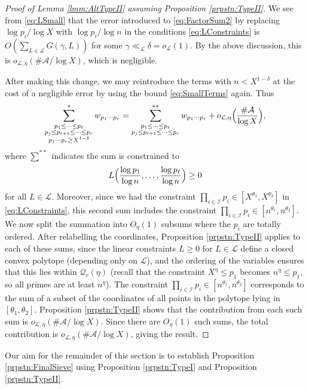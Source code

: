 \documentclass[10pt]{amsart}
\theoremstyle{plain}
\numberwithin{sblmm}{thrm}
\numberwithin{equation}{section}
\begin{document}
\begin{proof}[Proof of Lemma \ref{lmm:AltTypeII} assuming Proposition \ref{prpstn:TypeII}]
We see from \eqref{eq:LSmall} that the error introduced to \eqref{eq:FactorSum2} by replacing $\log{p_i}/\log{X}$ with $\log{p_i}/\log{n}$ in the conditions \eqref{eq:LConstraints} is $O(\sum_{L\in\mathcal{L}}G(\gamma,L))$ for some $\gamma\ll_\mathcal{L}\delta=o_\mathcal{L}(1)$. By the above discussion, this is $o_{\mathcal{L},\eta}(\#\mathcal{A}/\log{X})$, which is negligible.

After making this change, we may reintroduce the terms with $n<X^{1-\delta}$ at the cost of a negligible error by using the bound \eqref{eq:SmallTerms} again.
Thus
\[
\sum_{\substack{p_1\le \dots\le p_\ell \\ p_j\le p_{\ell+1}\le \dots \le p_r\\ p_1\cdots p_r \ge X^{1-\delta}}}^* w_{p_1\cdots p_r}=\sum_{\substack{p_1\le \dots\le p_\ell \\ p_j\le p_{\ell+1}\le \dots \le p_r}}^{**} w_{p_1\cdots p_r}+o_{\mathcal{L},\eta}\Bigl(\frac{\#\mathcal{A}}{\log{X}}\Bigr),
\]
where $\sum^{**}$ indicates the sum is constrained to
\[
L\Bigl(\frac{\log{p_1}}{\log{n}},\dots,\frac{\log{p_\ell}}{\log{n}}\Bigr)\ge 0
\]
for all $L\in\mathcal{L}$. Moreover, since we had the constraint $\prod_{i\in\mathcal{I}}p_i\in [X^{\theta_1},X^{\theta_2}]$ in \eqref{eq:LConstraints}, this second sum includes the constraint $\prod_{i\in\mathcal{I}}p_i\in [n^{\theta_1},n^{\theta_2}]$. We now split the summation into $O_\eta(1)$ subsums where the $p_i$ are totally ordered. After relabelling the coordinates, Proposition \ref{prpstn:TypeII} applies to each of these sums, since the linear constraints $L\ge 0$ for $L\in\mathcal{L}$ define a closed convex polytope (depending only on $\mathcal{L}$), and the ordering of the variables ensures that this lies within $\mathcal{Q}_r(\eta)$ (recall that the constraint $X^\eta\le p_1$ becomes $n^\eta\le p_1$, so all primes are at least $n^\eta$). The constraint $\prod_{i\in\mathcal{I}}p_i\in [n^{\theta_1},n^{\theta_2}]$ corresponds to the sum of a subset of the coordinates of all points in the polytope lying in $[\theta_1,\theta_2]$. Proposition \ref{prpstn:TypeII} shows that the contribution from each such sum is $o_{\mathcal{L},\eta}(\#\mathcal{A}/\log{X})$. Since there are $O_\eta(1)$ such sums, the total contribution is $o_{\mathcal{L},\eta}(\#\mathcal{A}/\log{X})$, giving the result.
\end{proof}
%
%
%
%
Our aim for the remainder of this section is to establish Proposition \ref{prpstn:FinalSieve} using Proposition \ref{prpstn:TypeI} and Proposition \ref{prpstn:TypeII}. %
\end{document}
